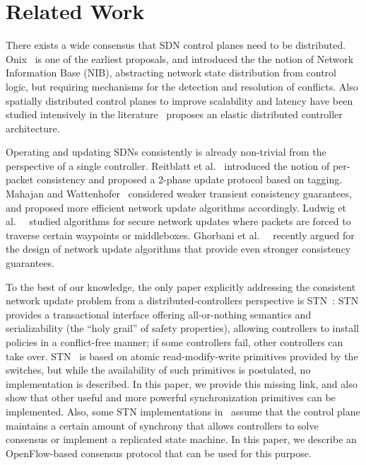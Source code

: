 \documentclass[conference]{sigcomm-alternate}
\begin{document}

\section{Related Work}\label{sec:relwork}

There exists a wide consensus that SDN control planes need to be distributed.~\cite{onos,onix,elasticon}
Onix~\cite{onix} is one of the earliest proposals, and introduced the
the notion of Network Information Base (NIB), abstracting network state
distribution from control logic, but
requiring mechanisms for the detection and resolution of conflicts.
Also spatially distributed control planes to improve scalability and
latency have been studied intensively
in the literature~\cite{kandoo,ctrl-place,hotsdn13loc}
proposes an elastic distributed controller architecture.

Operating and updating SDNs consistently is already non-trivial
from the perspective of a single controller. Reitblatt et al.~\cite{network-update}
introduced the notion of
per-packet consistency and proposed a 2-phase update protocol based on tagging.
Mahajan and Wattenhofer~\cite{roger-hotnets} considered weaker transient
consistency guarantees, and proposed more efficient network update algorithms
accordingly. Ludwig et al.~~\cite{hotnets14update} studied algorithms for secure
network updates where packets are forced to traverse certain waypoints or
middleboxes. Ghorbani et al.~~\cite{correct-virt} recently argued for the design
of network update algorithms that provide even stronger consistency guarantees.

To the best of our knowledge, the only paper explicitly addressing the consistent
network update problem from a distributed-controllers perspective is STN~\cite{stn}:
STN provides a transactional interface offering all-or-nothing semantics and serializability
(the ``holy grail'' of safety properties), allowing
controllers to install policies in a conflict-free manner; if some controllers fail,
other controllers can take over. STN~\cite{stn} is based on
atomic read-modify-write primitives provided by the switches, but
while the availability of such primitives is postulated, no implementation is
described. In this paper, we provide this missing link, and also show that other useful and
more powerful synchronization primitives can be implemented. 
Also, some STN implementations in~\cite{stn} assume that the control
plane maintains a certain amount of synchrony that allows controllers
to solve consensus or implement a replicated state machine.     
In this paper, we describe an OpenFlow-based consensus protocol that
can be used for this purpose.  
\end{document}
